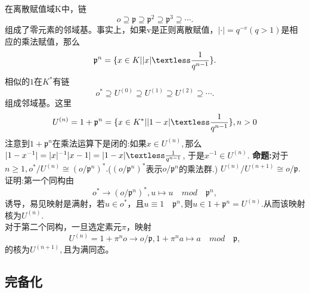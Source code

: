 \documentclass[UTF8]{article}
\begin{document}
     在离散赋值域K中，链$$
     o\supseteq \mathfrak{p}\supseteq \mathfrak{p}^{2}\supseteq \mathfrak{p}^{3}\supseteq \cdots .
     $$
     组成了零元素的邻域基。事实上，如果v是正则离散赋值，$|\cdot|=q^{-v}(q>1)$是相应的乘法赋值，那么$$
     \mathfrak{p}^{n}=\{x\in K||x|\textless\frac{1}{q^{n-1}}\}.
     $$
     相似的$1$在$K^{*}$有链$$
     o^{*}\supseteq U^{(0)}\supseteq U^{(1)}\supseteq U^{(2)}\supseteq\cdots .
     $$
     组成邻域基。这里$$
     U^{(n)}=1+\mathfrak{p}^{n}=\{x\in K^{*}||1-x|\textless\frac{1}{q^{n-1}}\},n>0
     $$
     注意到$1+\mathfrak{p}^{n}$在乘法运算下是闭的:如果$x\in U^{(n)},$那么$|1-x^{-1}|=|x|^{-1}|x-1|=|1-x|\textless\frac{1}{q^{n-1}}$,
于是$x^{-1}\in U^{(n)}.$     
\textbf{命题:}对于$n\geq 1,$$o^{*}/U^{(n)}\cong (o/\mathfrak{p}^{n})^{*}.$($(o/\mathfrak{p}^{n})^{*}$表示$o/\mathfrak{p}^{n}$的乘法群.)  $U^{(n)}/U^{(n+1)}\cong o/\mathfrak{p}.$\\
证明:第一个同构由$$
o^{*}\rightarrow (o/\mathfrak{p}^{n})^{*},u\mapsto u\quad mod \quad \mathfrak{p}^{n},
$$诱导，易见映射是满射，若$u\in o^{*}$，且$u\equiv 1 \quad \mathfrak{p}^{n},$则$u\in 1+\mathfrak{p}^{n}=U^{(n)}.$从而该映射核为$U^{(n)}.$\\
对于第二个同构，一旦选定素元$\pi$，映射$$
U^{(n)}=1+\pi^{n}o\rightarrow o/\mathfrak{p},1+\pi^{n}a\mapsto a\quad mod \quad \mathfrak{p},
$$
的核为$U^{(n+1)},$且为满同态。\\
    \subsection{完备化}
    
\end{document}
